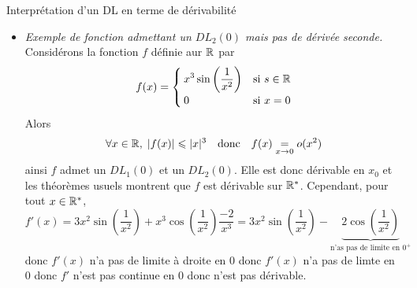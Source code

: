 \documentclass{article}
\renewenvironment{question_kholle}[2][ ]
{
	\subsection{\texorpdfstring{#2}{}}
	\notblank{#1}
	{
		\noindent #1
		\bigbreak
	}
	{}
	\begin{proof}
}
{
	\end{proof}
}
\begin{document}
\begin{question_kholle}{Interprétation d’un DL en terme de dérivabilité}
\begin{itemize}[label=$\vartriangleright$]
\begin{description}
			      \item[$(\impliedby)$] Réciproquement, si $f$ est dérivable en $x_{0}$, alors $f$ admet comme $DL_{1}(x_{0})$ son approximation au premier ordre, à savoir
			            \[
				            f(x)\underset{x \rightarrow a}{=} f(x_{0})+f'(x_{0})(x-x_{0})+o(x-x_{0})
			            \]
			            La preuve consiste à poser l’application
			            \[
				            \varepsilon \left|\applic{I}{\R}{x}{\begin{cases}
						            \frac{f(x)-f(x_{0}) - f'(x_{0})(x-x_{0})}{x-x_{0}} & \text{si $x\in I\setminus\{x_{0}\}$} \\
						            0                                                  & \text{si $x=x_{0}$}
					            \end{cases}}\right.
			            \]
			            puis à montrer dans un premier temps que cette application convient, et dans un second temps à écrire $|\varepsilon(x)|$ comme la distance entre le taux d’accroissement en $x_{0}$ de $f$ et $f'(x_{0})$, pour pouvoir conclure en utilisant la définition de la dérivabilité de $f$ en $x_{0}$ (limite de son taux d’accroissement) quand à la convergence vers 0 de $\varepsilon$.
		      \end{description}
		\item \textit{Exemple de fonction admettant un $DL_{2}(0)$ mais pas de dérivée seconde.}\\
		      Considérons la fonction $f$ définie aur $\mathbb R$ par
		      \[
			      f(x)=\begin{cases}
				      \displaystyle x^{3}\sin \left(\frac{1}{x^{2}}\right) & \text{si $s\in\mathbb R$} \\
				      0                                                    & \text{si $x=0$}
			      \end{cases}
		      \]
		      Alors
		      \[
			      \forall x\in\mathbb R,\;|f(x)|\leqslant |x|^{3} \quad\text{donc}\quad f(x)\underset{x \rightarrow 0}{=} o(x^{2})
		      \]
		      ainsi $f$ admet un $DL_{1}(0)$ et un $DL_{2}(0)$. Elle est donc dérivable en $x_{0}$ et les théorèmes usuels montrent que $f$ est dérivable sur $\mathbb R^{*}$. Cependant, pour tout $x\in\mathbb R^{*}$,
		      \[
			      f'(x)=3x^{2}\sin \left(\frac{1}{x^{2}}\right) + x^{3}\cos \left(\frac{1}{x^{2}}\right)\frac{-2}{x^{3}} = 3x^{2}\sin \left(\frac{1}{x^{2}}\right) -\underbrace{2\cos \left(\frac{1}{x^{2}}\right)}_{\text{n’as pas de limite en $0^{+}$}}
		      \]
		      donc $f'(x)$ n’a pas de limite à droite en 0 donc $f'(x)$ n’a pas de limte en 0 donc $f'$ n’est pas continue en 0 donc n’est pas dérivable.
	\end{itemize}
\end{question_kholle}
\end{document}
